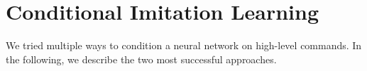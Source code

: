 \section{Conditional Imitation Learning}
\label{sec:cil}

We tried multiple ways to condition a neural network on high-level commands. In the following, we describe the two most successful approaches. 






